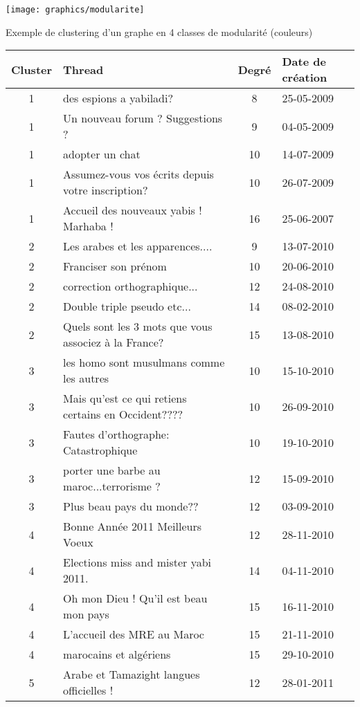\documentclass[symmetric,justified,marginals=raggedouter]{tufte-book}
\begin{document}
\begin{marginfigure}%
  \texttt{[image: graphics/modularite]}
  \vspace*{0.2cm}  
  \caption{Exemple de clustering d'un graphe en 4 classes de modularité (couleurs)}
  \label{fig:modularite}
\end{marginfigure} 

\begin{table*}
  \label{tab:threads}
  \begin{tabular}{clcl}
    \toprule
    Cluster & Thread & Degré & Date de création\\
    \midrule    
	1&des espions a yabiladi?&8&25-05-2009\\
	1&Un nouveau forum ? Suggestions ?&9&04-05-2009\\
	1&adopter un chat&10&14-07-2009\\
	1&Assumez-vous vos écrits depuis votre inscription?&10&26-07-2009\\
	1&Accueil des nouveaux yabis ! Marhaba !&16&25-06-2007\\
    \midrule 	
	2&Les arabes et les apparences....&9&13-07-2010\\
	2&Franciser son prénom&10&20-06-2010\\
	2&correction orthographique...&12&24-08-2010\\
	2&Double triple pseudo etc...&14&08-02-2010\\
	2&Quels sont les 3 mots que vous associez à la France?&15&13-08-2010\\
    \midrule 	
	3&les homo sont musulmans comme les autres&10&15-10-2010\\
	3&Mais qu'est ce qui retiens certains en Occident????&10&26-09-2010\\
	3&Fautes d'orthographe: Catastrophique&10&19-10-2010\\
	3&porter une barbe au maroc...terrorisme ?&12&15-09-2010\\
	3&Plus beau pays du monde??&12&03-09-2010\\
	\midrule 
	4&Bonne Année 2011 Meilleurs Voeux&12&28-11-2010\\
	4&Elections miss and mister yabi 2011.&14&04-11-2010\\
	4&Oh mon Dieu ! Qu'il est beau mon pays&15&16-11-2010\\
	4&L'accueil des MRE au Maroc&15&21-11-2010\\
	4&marocains et algériens&15&29-10-2010\\
    \midrule 	
	5&Arabe et Tamazight langues officielles !&12&28-01-2011\\

\end{tabular}
\end{table*}
\end{document}
